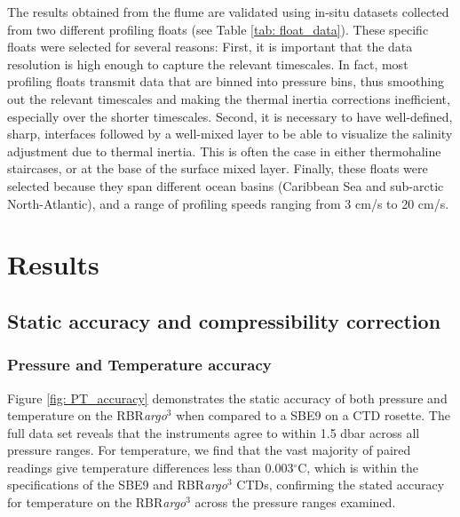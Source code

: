 \documentclass{ametsocV6.1}
\begin{document}
The results obtained from the flume are validated using in-situ datasets collected from two different profiling floats (see Table \ref{tab: float_data}). 
These specific floats were selected for several reasons: First, it is important that the data resolution is high enough to capture the relevant timescales. 
In fact, most profiling floats transmit data that are binned into pressure bins, thus smoothing out the relevant timescales and making the thermal inertia corrections inefficient, especially over the shorter timescales. 
Second, it is necessary to have well-defined,  sharp, interfaces followed by a well-mixed layer to be able to visualize the salinity adjustment due to thermal inertia. 
This is often the case in either thermohaline staircases, or at the base of the surface mixed layer. 
Finally, these floats were selected because they span different ocean basins (Caribbean Sea and sub-arctic North-Atlantic), and a range of profiling speeds ranging from 3 cm/s to 20 cm/s.


\section{Results}
\label{sec: results}
\subsection{Static accuracy and compressibility correction}

\subsubsection{Pressure and Temperature accuracy}
Figure \ref{fig: PT_accuracy} demonstrates the static accuracy of both pressure and temperature on the RBR\textit{argo}$^3$ when compared to a SBE9 on a CTD rosette.  The full data set reveals that the instruments agree to within 1.5 dbar across all pressure ranges.  For temperature, we find that the vast majority of paired readings give temperature differences less than 0.003$^\circ$C, which is within the specifications of the SBE9 and RBR\textit{argo}$^3$ CTDs, confirming the stated accuracy for temperature on the RBR\textit{argo}$^3$  across the pressure ranges examined.
\end{document}
